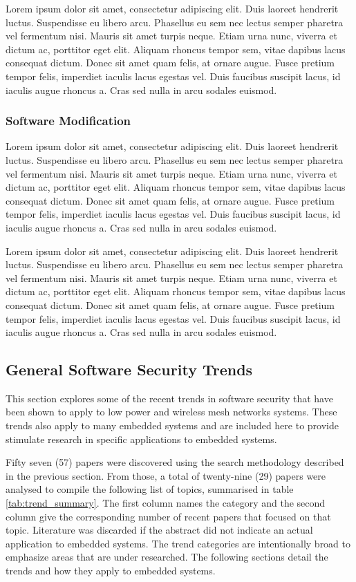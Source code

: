 \documentclass[final,conference,11pt]{IEEEtran}
\begin{document}
Lorem ipsum dolor sit amet, consectetur adipiscing elit. Duis laoreet hendrerit luctus. Suspendisse eu libero arcu. Phasellus eu sem nec lectus semper pharetra vel fermentum nisi. Mauris sit amet turpis neque. Etiam urna nunc, viverra et dictum ac, porttitor eget elit. Aliquam rhoncus tempor sem, vitae dapibus lacus consequat dictum. Donec sit amet quam felis, at ornare augue. Fusce pretium tempor felis, imperdiet iaculis lacus egestas vel. Duis faucibus suscipit lacus, id iaculis augue rhoncus a. Cras sed nulla in arcu sodales euismod.

\subsubsection{Software Modification}
Lorem ipsum dolor sit amet, consectetur adipiscing elit. Duis laoreet hendrerit luctus. Suspendisse eu libero arcu. Phasellus eu sem nec lectus semper pharetra vel fermentum nisi. Mauris sit amet turpis neque. Etiam urna nunc, viverra et dictum ac, porttitor eget elit. Aliquam rhoncus tempor sem, vitae dapibus lacus consequat dictum. Donec sit amet quam felis, at ornare augue. Fusce pretium tempor felis, imperdiet iaculis lacus egestas vel. Duis faucibus suscipit lacus, id iaculis augue rhoncus a. Cras sed nulla in arcu sodales euismod.

Lorem ipsum dolor sit amet, consectetur adipiscing elit. Duis laoreet hendrerit luctus. Suspendisse eu libero arcu. Phasellus eu sem nec lectus semper pharetra vel fermentum nisi. Mauris sit amet turpis neque. Etiam urna nunc, viverra et dictum ac, porttitor eget elit. Aliquam rhoncus tempor sem, vitae dapibus lacus consequat dictum. Donec sit amet quam felis, at ornare augue. Fusce pretium tempor felis, imperdiet iaculis lacus egestas vel. Duis faucibus suscipit lacus, id iaculis augue rhoncus a. Cras sed nulla in arcu sodales euismod.

\subsection{General Software Security Trends}

This section explores some of the recent trends in software security that have been shown to apply to low power and wireless mesh networks systems. These trends also apply to many embedded systems and are included here to provide stimulate research in specific applications to embedded systems.

Fifty seven (57) papers were discovered using the search methodology described in the previous section.  From those, a total of twenty-nine (29) papers were analysed to compile the following list of topics, summarised in table \ref{tab:trend_summary}.  The first column names the category and the second column give the corresponding number of recent papers that focused on that topic. Literature was discarded if the abstract did not indicate an actual application to embedded systems.  The trend categories are intentionally broad to emphasize areas that are under researched. The following sections detail  the trends and how they apply to embedded systems.
\end{document}
